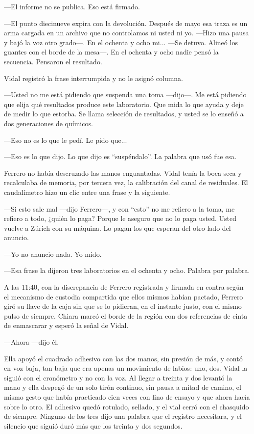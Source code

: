 ---El informe no se publica. Eso está firmado.

---El punto diecinueve expira con la devolución. Después de mayo esa traza es un arma cargada en un archivo que no controlamos ni usted ni yo. ---Hizo una pausa y bajó la voz otro grado---. En el ochenta y ocho mi... ---Se detuvo. Alineó los guantes con el borde de la mesa---. En el ochenta y ocho nadie pensó la secuencia. Pensaron el resultado.

Vidal registró la frase interrumpida y no le asignó columna.

---Usted no me está pidiendo que suspenda una toma ---dijo---. Me está pidiendo que elija qué resultados produce este laboratorio. Que mida lo que ayuda y deje de medir lo que estorba. Se llama selección de resultados, y usted se lo enseñó a dos generaciones de químicos.

---Eso no es lo que le pedí. Le pido que...

---Eso es lo que dijo. Lo que dijo es ``suspéndalo''. La palabra que usó fue esa.

Ferrero no había descruzado las manos enguantadas. Vidal tenía la boca seca y recalculaba de memoria, por tercera vez, la calibración del canal de residuales. El caudalímetro hizo un clic entre una frase y la siguiente.

---Si esto sale mal ---dijo Ferrero---, y con ``esto'' no me refiero a la toma, me refiero a todo, ¿quién lo paga? Porque le aseguro que no lo paga usted. Usted vuelve a Zúrich con su máquina. Lo pagan los que esperan del otro lado del anuncio.

---Yo no anuncio nada. Yo mido.

---Esa frase la dijeron tres laboratorios en el ochenta y ocho. Palabra por palabra.

A las 11:40, con la discrepancia de Ferrero registrada y firmada en contra según el mecanismo de custodia compartida que ellos mismos habían pactado, Ferrero giró su llave de la caja sin que se lo pidieran, en el instante justo, con el mismo pulso de siempre. Chiara marcó el borde de la región con dos referencias de cinta de enmascarar y esperó la señal de Vidal.

---Ahora ---dijo él.

Ella apoyó el cuadrado adhesivo con las dos manos, sin presión de más, y contó en voz baja, tan baja que era apenas un movimiento de labios: uno, dos. Vidal la siguió con el cronómetro y no con la voz. Al llegar a treinta y dos levantó la mano y ella despegó de un solo tirón continuo, sin pausa a mitad de camino, el mismo gesto que había practicado cien veces con lino de ensayo y que ahora hacía sobre lo otro. El adhesivo quedó rotulado, sellado, y el vial cerró con el chasquido de siempre. Ninguno de los tres dijo una palabra que el registro necesitara, y el silencio que siguió duró más que los treinta y dos segundos.


